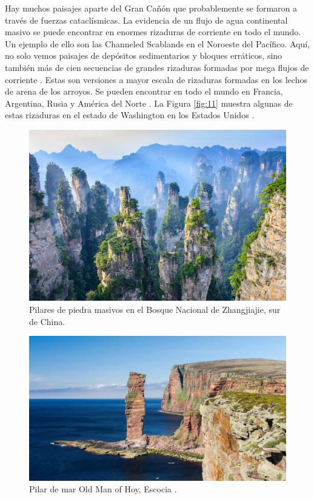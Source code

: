 \documentclass[10pt,twocolumn,letterpaper]{article}
\begin{document}
Hay muchos paisajes aparte del Gran Cañón que probablemente se formaron a través de fuerzas cataclísmicas. La evidencia de un flujo de agua continental masivo se puede encontrar en enormes rizaduras de corriente en todo el mundo. Un ejemplo de ello son las Channeled Scablands en el Noroeste del Pacífico. Aquí, no solo vemos paisajes de depósitos sedimentarios y bloques erráticos, sino también más de cien secuencias de grandes rizaduras formadas por mega flujos de corriente \cite{78,79}. Estas son versiones a mayor escala de rizaduras formadas en los lechos de arena de los arroyos. Se pueden encontrar en todo el mundo en Francia, Argentina, Rusia y América del Norte \cite{81}. La Figura \ref{fig:11} muestra algunas de estas rizaduras en el estado de Washington en los Estados Unidos \cite{80}.

\begin{figure}[t]
\begin{center}
   \includegraphics[width=1\linewidth]{zhangjiajie.jpg}
\end{center}
   \caption{Pilares de piedra masivos en el Bosque Nacional de Zhangjiajie, sur de China.}
\label{fig:12}
\label{fig:onecol}
\end{figure}

\begin{figure}[t]
\begin{center}
   \includegraphics[width=1\linewidth]{hoy.jpg}
\end{center}
   \caption{Pilar de mar Old Man of Hoy, Escocia \cite{83}.}
\label{fig:13}
\label{fig:onecol}
\end{figure}
\end{document}
